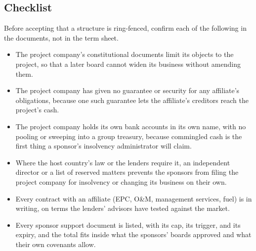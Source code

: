 \subsection*{Checklist}
Before accepting that a structure is ring-fenced, confirm each of the following in the documents, not in the term sheet.
\begin{itemize}
\item The project company's constitutional documents limit its objects to the project, so that a later board cannot widen its business without amending them.
\item The project company has given no guarantee or security for any affiliate's obligations, because one such guarantee lets the affiliate's creditors reach the project's cash.
\item The project company holds its own bank accounts in its own name, with no pooling or sweeping into a group treasury, because commingled cash is the first thing a sponsor's insolvency administrator will claim.
\item Where the host country's law or the lenders require it, an independent director or a list of reserved matters prevents the sponsors from filing the project company for insolvency or changing its business on their own.
\item Every contract with an affiliate (EPC, O\&M, management services, fuel) is in writing, on terms the lenders' advisors have tested against the market.
\item Every sponsor support document is listed, with its cap, its trigger, and its expiry, and the total fits inside what the sponsors' boards approved and what their own covenants allow.
\end{itemize}

